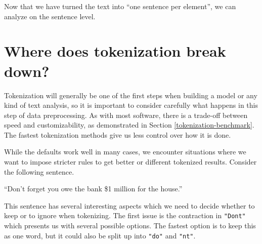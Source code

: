 \documentclass[
]{krantz}
\makeatletter
\newenvironment{Shaded}{\begin{snugshade}}{\end{snugshade}}
\newcommand{\AttributeTok}[1]{\textcolor[rgb]{0.77,0.63,0.00}{#1}}
\newcommand{\FunctionTok}[1]{\textcolor[rgb]{0.00,0.00,0.00}{#1}}
\newcommand{\NormalTok}[1]{#1}
\newcommand{\OtherTok}[1]{\textcolor[rgb]{0.56,0.35,0.01}{#1}}
\newcommand{\SpecialCharTok}[1]{\textcolor[rgb]{0.00,0.00,0.00}{#1}}
\newcommand{\StringTok}[1]{\textcolor[rgb]{0.31,0.60,0.02}{#1}}
\renewenvironment{quote}{\begin{VF}}{\end{VF}}
\newenvironment{kframe}{%
\medskip{}
\setlength{\fboxsep}{.8em}
 \def\at@end@of@kframe{}%
 \ifinner\ifhmode%
  \def\at@end@of@kframe{\end{minipage}}%
  \begin{minipage}{\columnwidth}%
 \fi\fi%
 \def\FrameCommand##1{\hskip\@totalleftmargin \hskip-\fboxsep
 \colorbox{shadecolor}{##1}\hskip-\fboxsep
     \hskip-\linewidth \hskip-\@totalleftmargin \hskip\columnwidth}%
 \MakeFramed {\advance\hsize-\width
   \@totalleftmargin\z@ \linewidth\hsize
   \@setminipage}}%
 {\par\unskip\endMakeFramed%
 \at@end@of@kframe}
\renewenvironment{Shaded}{\begin{kframe}}{\end{kframe}}
\makeatother
\begin{document}
\begin{Shaded}
\end{Shaded}

Now that we have turned the text into ``one sentence per element'', we can analyze on the sentence level.

\hypertarget{where-does-tokenization-break-down}{%
\section{Where does tokenization break down?}\label{where-does-tokenization-break-down}}

Tokenization will generally be one of the first steps when building a model or any kind of text analysis, so it is important to consider carefully what happens in this step of data preprocessing. As with most software, there is a trade-off between speed and customizability, as demonstrated in Section \ref{tokenization-benchmark}. The fastest tokenization methods give us less control over how it is done.

While the defaults work well in many cases, we encounter situations where we want to impose stricter rules to get better or different tokenized results. Consider the following sentence.

\begin{quote}
``Don't forget you owe the bank \$1 million for the house.''
\end{quote}

This sentence has several interesting aspects which we need to decide whether to keep or to ignore when tokenizing. The first issue is the contraction in \texttt{"Don\textquotesingle{}t"} which presents us with several possible options. The fastest option is to keep this as one word, but it could also be split up into \texttt{"do"} and \texttt{"n\textquotesingle{}t"}.
\end{document}
